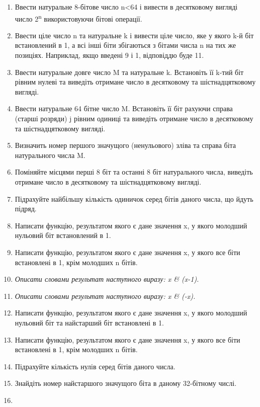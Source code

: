 \documentclass[]{article}
\begin{document}
\begin{enumerate}
\def\labelenumi{\arabic{enumi})}
\item
  Ввести натуральне 8-бітове число n\textless{}64 і вивести в
  десятковому вигляді число 2\textsuperscript{n} використовуючи бітові
  операції.
\item
  Ввести ціле число n та натуральне k і вивести ціле число, яке у якого
  k-й біт встановлений в 1, а всі інші біти збігаються з бітами числа n
  на тих же позиціях. Наприклад, якщо введені 9 і 1, відповіддю буде 11.
\item
  Ввести натуральне довге число
  \protect\hypertarget{__DdeLink__4_8035966481}{}{}M та натуральне k.
  Встановіть її k-тий біт рівним нулеві та виведіть отримане число в
  десятковому та шістнадцятковому вигляді.
\item
  Ввести натуральне 64 бітне число M. Встановіть її біт рахуючи справа
  (старші розряди) j рівним одиниці та виведіть отримане число в
  десятковому та шістнадцятковому вигляді.
\item
  Визначить номер першого значущого (ненульового) зліва та справа біта
  натурального числа M.
\item
  Поміняйте місцями перші 8 біт та останні 8 біт натурального числа,
  виведіть отримане число в десятковому та шістнадцятковому вигляді.
\item
  Підрахуйте найбільшу кількість одиничок серед бітів даного числа, що
  йдуть підряд.
\item
  Написати функцію, результатом якого є дане значення x, у якого
  молодший нульовий біт встановлений в 1.
\item
  Написати функцію, результатом якого є дане значення x, у якого все
  біти встановлені в 1, крім молодших n бітів.
\item
  \emph{Описати словами результат наступного виразу: x \& (x-1).}
\item
  \emph{Описати словами результат наступного виразу: x \& (-x).}
\item
  Написати функцію, результатом якого є дане значення x, у якого
  молодший нульовий біт та найстарший біт встановлені в 1.
\item
  Написати функцію, результатом якого є дане значення x, у якого все
  біти встановлені в 1, крім молодших n бітів.
\item
  Підрахуйте кількість нулів серед бітів даного числа.
\item
  Знайдіть номер найстаршого значущого біта в даному 32-бітному числі.
\item

\end{enumerate}
\end{document}
